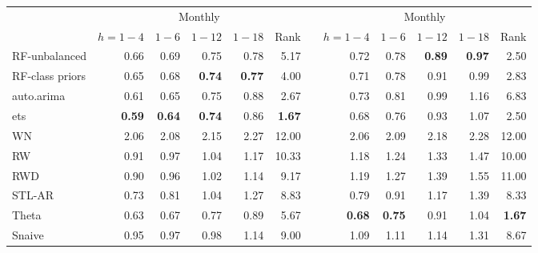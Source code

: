\documentclass[11pt,a4paper,]{article}
\theoremstyle{definition}
\theoremstyle{definition}
\theoremstyle{definition}
\theoremstyle{remark}
\begin{document}
\begin{table}[!htbp]
\begin{tabular}{lrrrrrrrrrrr}
           &                                   \multicolumn{ 5}{c}{Monthly} &            &                                   \multicolumn{ 5}{c}{Monthly} \\
                     &    $h=1-4$ &    $1-6$   &     $1-12$ &    $1-18$  &   Rank     &            &   $h=1-4$  &    $1-6$   &    $1-12$  &    $1-18$  &   Rank \\\cmidrule(lr){2-6} \cmidrule(lr){8-12}
RF-unbalanced        &       0.66 &       0.69 &       0.75 &       0.78 &       5.17 &            &       0.72 &       0.78 & {\bf 0.89} & {\bf 0.97} &       2.50 \\
RF-class priors      &       0.65 &       0.68 & {\bf 0.74} & {\bf 0.77} &       4.00 &            &       0.71 &       0.78 &       0.91 &       0.99 &       2.83 \\
auto.arima           &       0.61 &       0.65 &       0.75 &       0.88 &       2.67 &            &       0.73 &       0.81 &       0.99 &       1.16 &       6.83 \\
ets                  & {\bf 0.59} & {\bf 0.64} & {\bf 0.74} &       0.86 & {\bf 1.67} &            &       0.68 &       0.76 &       0.93 &       1.07 &       2.50 \\
WN                   &       2.06 &       2.08 &       2.15 &       2.27 &      12.00 &            &       2.06 &       2.09 &       2.18 &       2.28 &      12.00 \\
RW                   &       0.91 &       0.97 &       1.04 &       1.17 &      10.33 &            &       1.18 &       1.24 &       1.33 &       1.47 &      10.00 \\
RWD                  &       0.90 &       0.96 &       1.02 &       1.14 &       9.17 &            &       1.19 &       1.27 &       1.39 &       1.55 &      11.00 \\
STL-AR               &       0.73 &       0.81 &       1.04 &       1.27 &       8.83 &            &       0.79 &       0.91 &       1.17 &       1.39 &       8.33 \\
Theta                &       0.63 &       0.67 &       0.77 &       0.89 &       5.67 &            & {\bf 0.68} & {\bf 0.75} &       0.91 &       1.04 & {\bf 1.67} \\
Snaive               &       0.95 &       0.97 &       0.98 &       1.14 &       9.00 &            &       1.09 &       1.11 &       1.14 &       1.31 &       8.67 \\
\bottomrule
\end{tabular}
\end{table}
\end{document}
